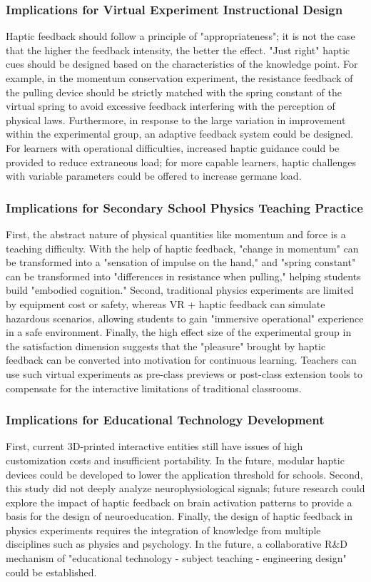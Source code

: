 \documentclass[runningheads]{llncs}
\begin{document}
\subsubsection{Implications for Virtual Experiment Instructional Design}
Haptic feedback should follow a principle of "appropriateness"; it is not the case that the higher the feedback intensity, the better the effect. "Just right" haptic cues should be designed based on the characteristics of the knowledge point. For example, in the momentum conservation experiment, the resistance feedback of the pulling device should be strictly matched with the spring constant of the virtual spring to avoid excessive feedback interfering with the perception of physical laws. Furthermore, in response to the large variation in improvement within the experimental group, an adaptive feedback system could be designed. For learners with operational difficulties, increased haptic guidance could be provided to reduce extraneous load; for more capable learners, haptic challenges with variable parameters could be offered to increase germane load.

\subsubsection{Implications for Secondary School Physics Teaching Practice}
First, the abstract nature of physical quantities like momentum and force is a teaching difficulty. With the help of haptic feedback, "change in momentum" can be transformed into a "sensation of impulse on the hand," and "spring constant" can be transformed into "differences in resistance when pulling," helping students build "embodied cognition." Second, traditional physics experiments are limited by equipment cost or safety, whereas VR + haptic feedback can simulate hazardous scenarios, allowing students to gain "immersive operational" experience in a safe environment. Finally, the high effect size of the experimental group in the satisfaction dimension suggests that the "pleasure" brought by haptic feedback can be converted into motivation for continuous learning. Teachers can use such virtual experiments as pre-class previews or post-class extension tools to compensate for the interactive limitations of traditional classrooms.

\subsubsection{Implications for Educational Technology Development}
First, current 3D-printed interactive entities still have issues of high customization costs and insufficient portability. In the future, modular haptic devices could be developed to lower the application threshold for schools. Second, this study did not deeply analyze neurophysiological signals; future research could explore the impact of haptic feedback on brain activation patterns to provide a basis for the design of neuroeducation. Finally, the design of haptic feedback in physics experiments requires the integration of knowledge from multiple disciplines such as physics and psychology. In the future, a collaborative R\&D mechanism of "educational technology - subject teaching - engineering design" could be established.
\end{document}
